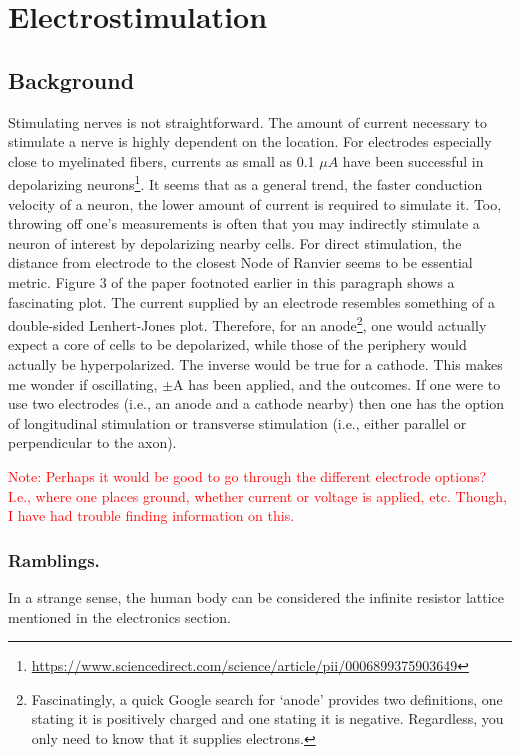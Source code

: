 \section{Electrostimulation}

\subsection{Background}
Stimulating nerves is not straightforward. The amount of current necessary to stimulate a nerve is highly dependent on the location. For electrodes especially close to myelinated fibers, currents as small as 0.1 $\mu A$ have been successful in depolarizing neurons\footnote{\url{https://www.sciencedirect.com/science/article/pii/0006899375903649}}. It seems that as a general trend, the faster conduction velocity of a neuron, the lower amount of current is required to simulate it. Too, throwing off one's measurements is often that you may indirectly stimulate a neuron of interest by depolarizing nearby cells. For direct stimulation, the distance from electrode to the closest Node of Ranvier seems to be essential metric. Figure 3 of the paper footnoted earlier in this paragraph shows a fascinating plot. The current supplied by an electrode resembles something of a double-sided Lenhert-Jones plot. Therefore, for an anode\footnote{Fascinatingly, a quick Google search for `anode' provides two definitions, one stating it is positively charged and one stating it is negative. Regardless, you only need to know that it supplies electrons.}, one would actually expect a core of cells to be depolarized, while those of the periphery would actually be hyperpolarized. The inverse would be true for a cathode. This makes me wonder if oscillating, $\pm$A has been applied, and the outcomes. If one were to use two electrodes (i.e., an anode and a cathode nearby) then one has the option of longitudinal stimulation or transverse stimulation (i.e., either parallel or perpendicular to the axon).\newline

\textcolor{red}{Note: Perhaps it would be good to go through the different electrode options? I.e., where one places ground, whether current or voltage is applied, etc. Though, I have had trouble finding information on this.}

\subsubsection{Ramblings.}
In a strange sense, the human body can be considered the infinite resistor lattice mentioned in the electronics section. 

